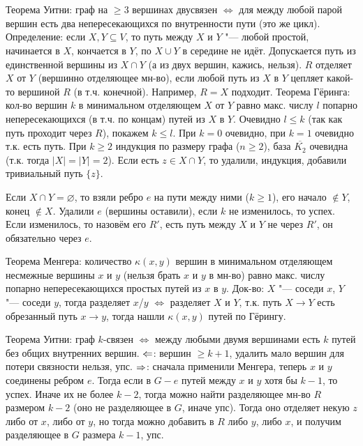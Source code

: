 \section{} %
	Теорема Уитни: граф на $\ge 3$ вершинах двусвязен $\iff$ для между любой парой вершин
	есть два непересекающихся по внутренности пути (это же цикл).
	Определение: если $X, Y \subseteq V$, то путь между $X$ и $Y$ "--- любой простой,
	начинается в $X$, кончается в $Y$, по $X \cup Y$ в середине не идёт.
	Допускается путь из единственной вершины из $X \cap Y$ (\TODO а из двух вершин, кажись, нельзя).
	$R$ отделяет $X$ от $Y$ (вершинно отделяющее мн-во), если любой путь из $X$ в $Y$
	цепляет какой-то вершиной $R$ (в т.ч. конечной).
	Например, $R=X$ подходит.
	Теорема Гёринга: кол-во вершин $k$ в минимальном отделяющем $X$ от $Y$ равно макс. числу $l$ попарно
	непересекающихся (в т.ч. по концам) путей из $X$ в $Y$.
	Очевидно $l \le k$ (так как путь проходит через $R$), покажем $k \le l$.
	При $k=0$ очевидно, при $k=1$ очевидно т.к. есть путь.
	При $k\ge 2$ индукция по размеру графа ($n \ge 2$), база $\overline{K_2}$ очевидна (т.к. тогда $|X|=|Y|=2$).
	Если есть $z\in X \cap Y$, то удалили, индукция, добавили тривиальный путь $\{z\}$.

	Если $X \cap Y =\varnothing$, то взяли ребро $e$ на пути между ними ($k \ge 1$), его начало $\notin Y$, конец $\notin X$.
	Удалили $e$ (вершины оставили), если $k$ не изменилось, то успех.
	Если изменилось, то назовём его $R'$, есть путь между $X$ и $Y$ не через $R'$, он обязательно через $e$.
	\TODO

	Теорема Менгера: количество $\kappa(x, y)$ вершин в минимальном отделяющем несмежные вершины $x$ и $y$ (нельзя брать $x$ и $y$ в мн-во)
	равно макс. числу попарно непересекающихся простых путей из $x$ в $y$.
	Док-во: $X$ "--- соседи $x$, $Y$ "--- соседи $y$, тогда разделяет $x$/$y$ $\iff$ разделяет $X$ и $Y$,
	т.к. путь $X \to Y$ есть обрезанный путь $x \to y$, тогда нашли $\kappa(x, y)$ путей по Гёрингу.

	Теорема Уитни: граф $k$-связен $\iff$ между любыми двумя вершинами есть $k$ путей без общих внутренних вершин.
	$\Leftarrow$: вершин $\ge k+1$, удалить мало вершин для потери связности нельзя, упс.
	$\Rightarrow$: сначала применили Менгера, теперь $x$ и $y$ соединены ребром $e$.
	Тогда если в $G-e$ путей между $x$ и $y$ хотя бы $k-1$, то успех.
	Иначе их не более $k-2$, тогда можно найти разделяющее мн-во $R$ размером $k-2$ (оно не разделяющее в $G$, иначе упс).
	Тогда оно отделяет некую $z$ либо от $x$, либо от $y$, но тогда можно добавить в $R$ либо $y$, либо $x$, и получим разделяющее в $G$ размера $k-1$, упс.

